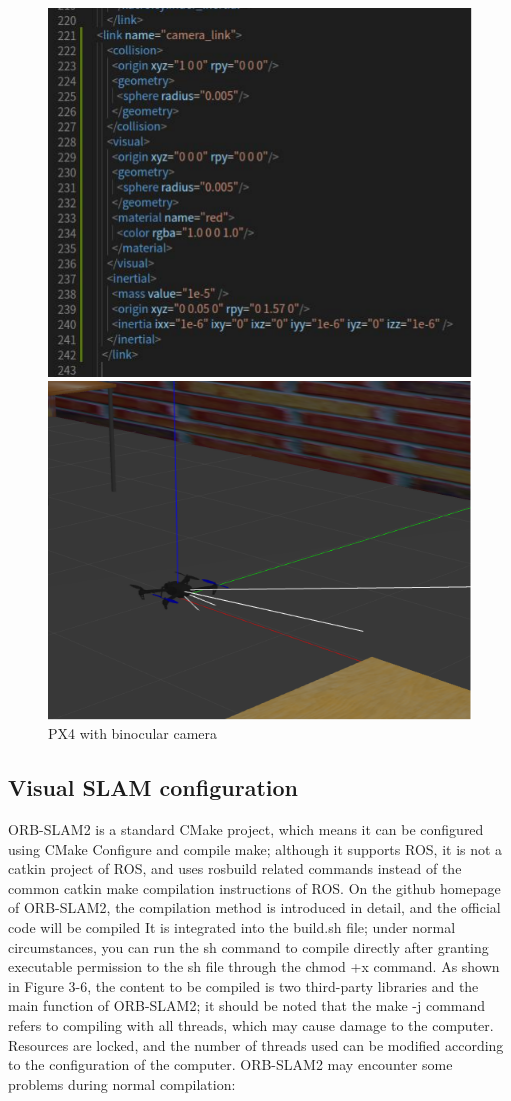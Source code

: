 \documentclass[conference]{IEEEtran}
\begin{document}
\begin{figure}[htbp]
    \centerline{\includegraphics[width=0.8\columnwidth]{code.png}}
    \centerline{\includegraphics[width=0.8\columnwidth]{px4.png}}
    \caption{PX4 with binocular camera}
\end{figure}

\subsection{Visual SLAM configuration}
ORB-SLAM2 is a standard CMake project, which means it can be configured using CMake
Configure and compile make; although it supports ROS, it is not a catkin project of ROS, and uses rosbuild related commands instead of the common catkin make compilation instructions of ROS.
On the github homepage of ORB-SLAM2, the compilation method is introduced in detail, and the official code will be compiled
It is integrated into the build.sh file; under normal circumstances, you can run the sh command to compile directly after granting executable permission to the sh file through the chmod +x command. As shown in Figure 3-6, the content to be compiled is two third-party libraries and the main function of ORB-SLAM2; it should be noted that the make -j command refers to compiling with all threads, which may cause damage to the computer. Resources are locked, and the number of threads used can be modified according to the configuration of the computer.
ORB-SLAM2 may encounter some problems during normal compilation:
\end{document}
